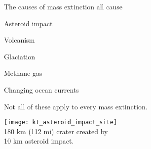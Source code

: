 \documentclass[t]{beamer}
\begin{document}
%
\begin{frame}[t]{The causes of mass extinction all cause }

	\begin{multicols}{2}
	\hangpara Asteroid impact
	
	\hangpara Volcanism
	
	\hangpara Glaciation
	
	\hangpara Methane gas
	
	\hangpara Changing ocean currents
	
	\hangpara Not all of these apply to every mass extinction.
	
	\columnbreak
	
	\texttt{[image: kt\_asteroid\_impact\_site]}\\
	{\footnotesize 180 km (112 mi) crater created by\\10 km asteroid impact.}

	\end{multicols}
	
\end{frame}
%
\end{document}
